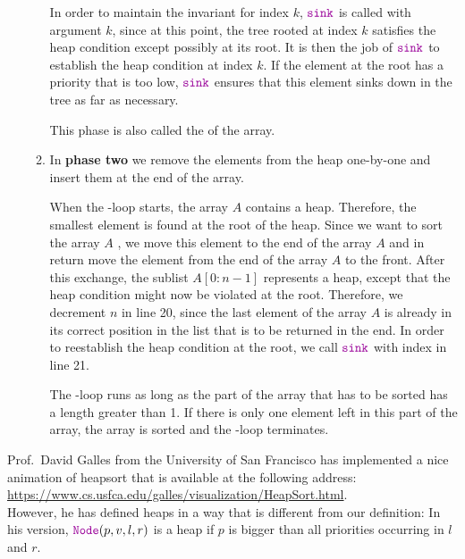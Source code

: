 \begin{enumerate}
\begin{enumerate}
            In order to maintain the invariant for index ${k}$, $\mytt{sink}$ is called with
            argument ${k}$,  since at this point, the tree rooted at index ${k}$ satisfies
            the heap condition except possibly at its root.  It is then the job of $\mytt{sink}$ to
            establish the heap condition at index ${k}$.  If the element at the root has a
            priority that is too low, $\mytt{sink}$ ensures that this element sinks down in the tree
            as far as necessary.

            This phase is also called the   of the array.
      \item In \textbf{phase two} we remove the elements from the heap one-by-one and insert them at the end of
            the array.

            When the -loop starts, the array ${A}$ contains a heap.  Therefore,
            the smallest element is found at the root of the heap.  Since we want to sort the
            array ${A}$ , we move this element to the end of the array ${A}$ and in
            return move the element from the end of the array ${A}$ to the front.
            After this exchange, the sublist $A[0:n-1]$ represents a heap, except that the
            heap condition might now be violated at the root.  Therefore, we decrement ${n}$ in line 20, since the
            last element of the array ${A}$ is already in its correct position in the list that is to be
            returned in the end.  In order to reestablish the heap condition at the root, we call $\mytt{sink}$ with index
             in line 21.

            The -loop runs as long as the part of the array that has to be sorted has
            a length greater than 1.  If there is only one element left in this part of the array, the array is
            sorted and the -loop terminates.
      \end{enumerate}
\end{enumerate}
Prof.~David Galles from the University of San Francisco has implemented a nice animation of heapsort that is
available at the following address:
\\[0.2cm]
\hspace*{1.3cm}
\href{https://www.cs.usfca.edu/~galles/visualization/HeapSort.html}{https://www.cs.usfca.edu/galles/visualization/HeapSort.html}.
\\[0.2cm] 
However, he has defined heaps in a way that is different from our definition:  In his version,
$\mytt{Node}(p, v, l, r)$ is a heap if $p$ is bigger than all priorities occurring in $l$ and $r$.


